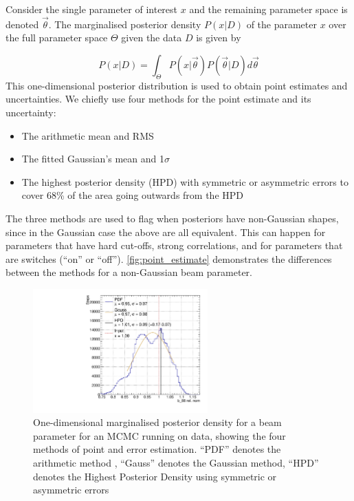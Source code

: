 Consider the single parameter of interest $x$ and the remaining parameter space is denoted $\vec{\theta}$. The marginalised posterior density $P(x|D)$ of the parameter $x$ over the full parameter space $\Theta$ given the data $D$ is given by

\begin{equation}
P(x|D) = \int_\Theta P(x|\vec{\theta}) P(\vec{\theta}|D) d\vec{\theta}
\end{equation}
This one-dimensional posterior distribution is used to obtain point estimates and uncertainties. We chiefly use four methods for the point estimate and its uncertainty:
\begin{itemize}
	\item The arithmetic mean and RMS
	\item The fitted Gaussian's mean and 1$\sigma$
	\item The highest posterior density (HPD) with symmetric or asymmetric errors to cover 68\% of the area going outwards from the HPD
\end{itemize}
The three methods are used to flag when posteriors have non-Gaussian shapes, since in the Gaussian case the above are all equivalent. This can happen for parameters that have hard cut-offs, strong correlations, and for parameters that are switches (``on'' or ``off''). \autoref{fig:point_estimate} demonstrates the differences between the methods for a non-Gaussian beam parameter.
\begin{figure}[h]
	\includegraphics[width=0.6\textwidth, trim={0mm 0mm 0mm 0mm}, clip,page=1]{figures/mcmc/b88_example}
	\caption{One-dimensional marginalised posterior density for a beam parameter for an MCMC running on data, showing the four methods of point and error estimation. ``PDF'' denotes the arithmetic method , ``Gauss'' denotes the Gaussian method, ``HPD'' denotes the Highest Posterior Density using symmetric or asymmetric errors}
	\label{fig:point_estimate}
\end{figure}

